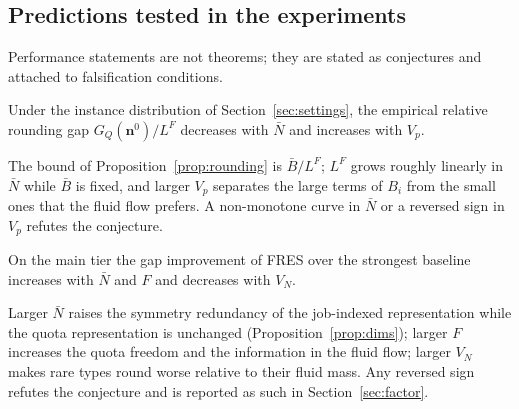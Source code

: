 \subsection{Predictions tested in the experiments}\label{sec:predictions}
Performance statements are not theorems; they are stated as conjectures and attached to falsification conditions.

\begin{conjecture}\label{conj:rounding}
Under the instance distribution of Section~\ref{sec:settings}, the empirical relative rounding gap $G_Q(\mathbf{n}^0)/L^F$
decreases with $\bar N$ and increases with $V_p$.
\end{conjecture}
The bound of Proposition~\ref{prop:rounding} is $\bar B/L^F$; $L^F$ grows roughly linearly in $\bar N$ while $\bar B$ is
fixed, and larger $V_p$ separates the large terms of $B_i$ from the small ones that the fluid flow prefers. A non-monotone
curve in $\bar N$ or a reversed sign in $V_p$ refutes the conjecture.

\begin{conjecture}\label{conj:gain}
On the main tier the gap improvement of FRES over the strongest baseline increases with $\bar N$ and $F$ and decreases
with $V_N$.
\end{conjecture}
Larger $\bar N$ raises the symmetry redundancy of the job-indexed representation while the quota representation is
unchanged (Proposition~\ref{prop:dims}); larger $F$ increases the quota freedom and the information in the fluid flow;
larger $V_N$ makes rare types round worse relative to their fluid mass. Any reversed sign refutes the conjecture and is
reported as such in Section~\ref{sec:factor}.
